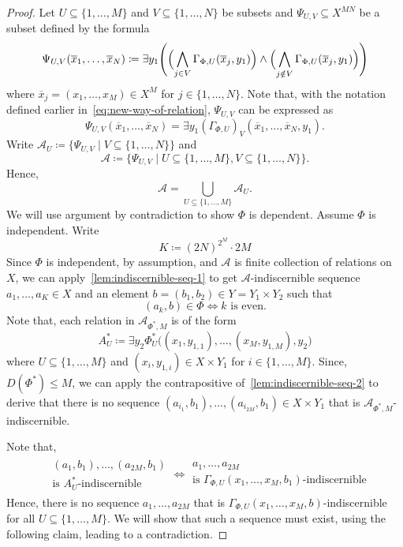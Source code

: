 \begin{proof}

    Let $U \subseteq \{1, \dots, M\}$ and $V \subseteq \{1, \dots, N\}$ be subsets and $\Psi_{U, V} \subseteq X^{MN}$ be a subset defined by the formula
    \[
        \Psi_{U, V}(\overline{x}_1, \dots, \overline{x}_N) \coloneq \exists y_1 \Biggl(\Bigl(\bigwedge_{j \in V} \Gamma_{\Phi, U} (\overline{x}_j, y_1)\Bigr) \land \Bigl(\bigwedge_{j \notin V} \Gamma_{\Phi, U} (\overline{x}_j, y_1)\Bigr) \Biggr)
    \]
    where $\overline{x}_j = (x_1, \dots, x_M) \in X^M$ for $j \in \{1, \dots, N\}$. Note that, with the notation defined earlier in~\ref{eq:new-way-of-relation}, $\Psi_{U, V}$ can be expressed as
    \[
        \Psi_{U, V}(\overline{x}_1, \dots, \overline{x}_N) = \exists y_1 (\Gamma_{\Phi, U})_{V}(\overline{x}_1, \dots, \overline{x}_N, y_1).
    \]
    Write $\mathcal{A}_{U} \coloneq \{\Psi_{U, V} \mid V \subseteq \{1, \dots, N\}\}$ and
    \[
        \mathcal{A} \coloneq \{\Psi_{U, V} \mid U \subseteq \{1, \dots, M\}, V \subseteq \{1, \dots, N\}\}.
    \]
    Hence,
    \[
        \mathcal{A} = \bigcup_{U \subseteq \{1, \dots, M\}} \mathcal{A}_U.
    \]
    We will use argument by contradiction to show $\Phi$ is dependent. Assume $\Phi$ is independent. Write
    \[
        K \coloneq (2N)^{2^M} \cdot 2M
    \]
    Since $\Phi$ is independent, by assumption, and $\mathcal{A}$ is finite collection of relations on $X$, we can apply~\ref{lem:indiscernible-seq-1} to get $\mathcal{A}$-indiscernible sequence $a_1, \dots, a_K \in X$ and an element $b = (b_1, b_2) \in Y = Y_1 \times Y_2$ such that
    \[
        (a_k, b) \in \Phi \iff k \text{ is even.}
    \]
    Note that, each relation in $\mathcal{A}_{\Phi^{*}, M}$ is of the form
    \[
        A^*_{U} \coloneq \exists y_2 \Phi^{*}_{U}\bigl((x_1, y_{1, 1}), \dots,(x_M, y_{1, M}), y_2 \bigr)
    \]
    where $U \subseteq \{1, \dots, M\}$ and $(x_i, y_{1, i}) \in X \times Y_1$ for $i \in \{1, \dots, M\}$.
    Since, $D(\Phi^{*}) \leq M$, we can apply the contrapositive of~\ref{lem:indiscernible-seq-2} to derive that there is no sequence $(a_{i_1}, b_1), \dots, (a_{i_{2M}}, b_1) \in X \times Y_1$ that is $\mathcal{A}_{\Phi^{*}, M}$-indiscernible.

    Note that,
    \[
        \begin{aligned}
            &\begin{array}{c}
            (a_1, b_1)
                 , \dots, (a_{2M}, b_1) \\
                 \text{is $A^*_{U}$-indiscernible}
            \end{array}
            \iff
            \begin{array}{c}
                a_1, \dots, a_{2M} \\
                \text{is $\Gamma_{\Phi,U}(x_1, \dots, x_M, b_1)$-indiscernible}
            \end{array}
        \end{aligned}
    \]
    Hence, there is no sequence $a_1, \dots, a_{2M}$ that is $\Gamma_{\Phi,U}(x_1, \dots, x_M, b)$-indiscernible for all $U \subseteq \{1, \dots, M\}$. We will show that such a sequence must exist, using the following claim, leading to a contradiction.




\end{proof}
